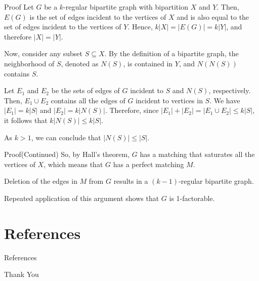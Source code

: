 \documentclass{beamer}
\begin{document}
     \begin{frame}{Proof}
     	Let $G$ be a $k$-regular bipartite graph with bipartition $X$ and $Y$. Then, $E(G)$ is the set of edges incident to the vertices of $X$ and is also equal to the set of edges incident to the vertices of $Y$. Hence, $k|X| = |E(G)| = k|Y|$, and therefore $|X| = |Y|$. 
     	
     	Now, consider any subset $S \subseteq X$. By the definition of a bipartite graph, the neighborhood of $S$, denoted as $N(S)$, is contained in $Y$, and $N(N(S))$ contains $S$. 
     	
     	Let $E_1$ and $E_2$ be the sets of edges of $G$ incident to $S$ and $N(S)$, respectively. Then, $E_1 \cup E_2$ contains all the edges of $G$ incident to vertices in $S$. We have $|E_1| = k|S|$ and $|E_2| = k|N(S)|$. Therefore, since $|E_1| + |E_2| = |E_1 \cup E_2| \leq k|S|$, it follows that $k|N(S)| \leq k|S|$. 
     	
     	As $k > 1$, we can conclude that $|N(S)| \leq |S|$. 
     \end{frame}
 
    \begin{frame}{Proof(Continued)}
    	So, by Hall's theorem, $G$ has a matching that saturates all the vertices of $X$, which means that $G$ has a perfect matching $M$. 
    	
    	Deletion of the edges in $M$ from $G$ results in a $(k - 1)$-regular bipartite graph. 
    	
    	Repeated application of this argument shows that $G$ is 1-factorable.
    \end{frame}
	
	\section{References}
	\begin{frame}{References}
		
		
	\end{frame}
	
	\begin{frame}
		\centering
		\Huge{Thank You}
	\end{frame}
	
	
	
\end{document}

